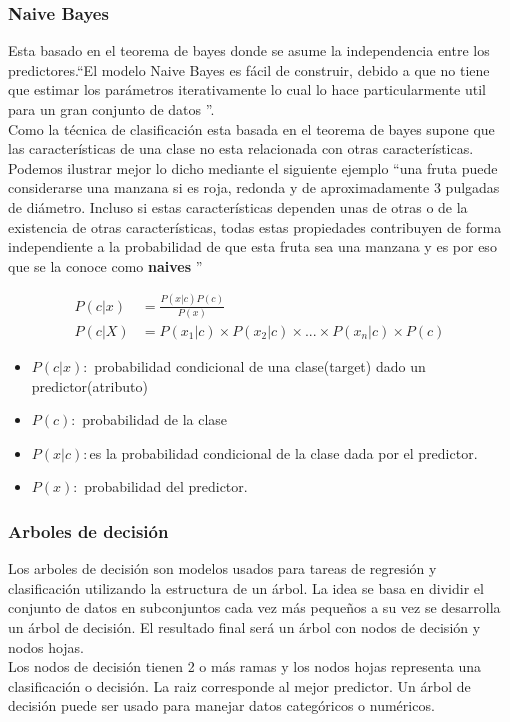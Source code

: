 \subsubsection*{Naive Bayes}
Esta basado en el teorema de bayes donde se asume la independencia entre los predictores.\textquotedblleft El modelo Naive Bayes es fácil de construir, debido a que no tiene que estimar los parámetros iterativamente lo cual lo hace particularmente util para un gran conjunto de datos \textquotedblright \cite{WEBSITE:8}.\\
Como la  técnica de clasificación esta basada en el teorema de bayes supone que las características de una clase no esta relacionada con otras características.\\ Podemos ilustrar mejor lo dicho mediante el siguiente ejemplo  \textquotedblleft una fruta puede considerarse una manzana si es roja, redonda y de aproximadamente 3 pulgadas de diámetro. Incluso si estas características dependen unas de otras o de la existencia de otras características, todas estas propiedades contribuyen de forma independiente a la probabilidad de que esta fruta sea una manzana y es por eso que se la conoce como \textbf{naives}  \textquotedblright \cite{WEBSITE:4}


\begin{equation}
  \label{eq:naives}
  \begin{aligned}
  P(c|x)&=\frac{P(x|c)P(c)}{P(x)}\\
  P(c|X)&=P(x_{1}|c)\times P(x_{2}|c)\times ... \times P(x_{n}|c)\times P(c)
  \end{aligned}
\end{equation}

\begin{itemize}
	\item $P(c|x):$ probabilidad condicional de una clase(target) dado un predictor(atributo)
	\item $P(c):$ probabilidad de la clase
	\item $P(x|c):$es la probabilidad condicional de la clase dada por el predictor.
	\item $P(x):$ probabilidad del predictor.
	
\end{itemize}

\subsubsection*{Arboles de decisión}
Los arboles de decisión son modelos usados para tareas de regresión y clasificación utilizando la estructura de un árbol. La idea se basa en dividir el conjunto de datos en subconjuntos cada vez más pequeños a su vez se desarrolla un árbol de decisión. El resultado final será un árbol con nodos de decisión y nodos hojas.\\
Los nodos de decisión tienen 2 o más ramas y los nodos hojas representa una clasificación o decisión. La raiz corresponde al mejor predictor. Un árbol de decisión puede ser usado para manejar datos categóricos o numéricos.\\

